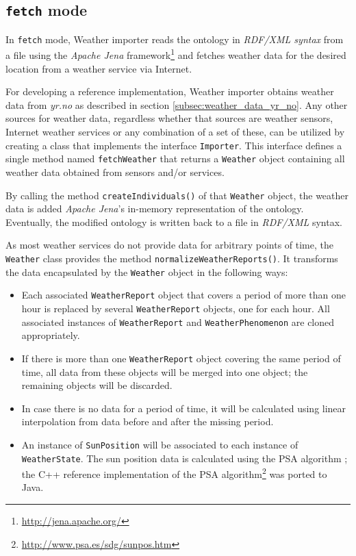 \subsection{\texttt{fetch} mode}

In \texttt{fetch} mode, Weather importer reads the \thinkhomeweather ontology in \emph{RDF/XML syntax} from a file using the \emph{Apache Jena} framework\footnote{\href{http://jena.apache.org/}{http://jena.apache.org/}} and fetches weather data for the desired location from a weather service via Internet.

For developing a reference implementation, Weather importer obtains weather data from \emph{yr.no} as described in section \ref{subsec:weather_data_yr_no}. Any other sources for weather data, regardless whether that sources are weather sensors, Internet weather services or any combination of a set of these, can be utilized by creating a class that implements the interface \texttt{Importer}. This interface defines a single method named \texttt{fetchWeather} that returns a \texttt{Weather} object containing all weather data obtained from sensors and/or services.

By calling the method \texttt{createIndividuals()} of that \texttt{Weather} object, the weather data is added \emph{Apache Jena}'s in-memory representation of the ontology. Eventually, the modified ontology is written back to a file in \emph{RDF/XML} syntax.

As most weather services do not provide data for arbitrary points of time, the \texttt{Weather} class provides the method \texttt{normalizeWeatherReports()}. It transforms the data encapsulated by the \texttt{Weather} object in the following ways:
\begin{itemize}
  \item Each associated \texttt{WeatherReport} object that covers a period of more than one hour is replaced by several \texttt{WeatherReport} objects, one for each hour. All associated instances of \texttt{WeatherReport} and \texttt{WeatherPhenomenon} are cloned appropriately.
  \item If there is more than one \texttt{WeatherReport} object covering the same period of time, all data from these objects will be merged into one object; the remaining objects will be discarded.
  \item In case there is no data for a period of time, it will be calculated using linear interpolation from data before and after the missing period.
  \item An instance of \texttt{SunPosition} will be associated to each instance of \texttt{WeatherState}. The sun position data is calculated using the PSA algorithm \cite{PSA_algorithm}; the C++ reference implementation of the PSA algorithm\footnote{\href{http://www.psa.es/sdg/sunpos.htm}{http://www.psa.es/sdg/sunpos.htm}} was ported to Java.
\end{itemize}

